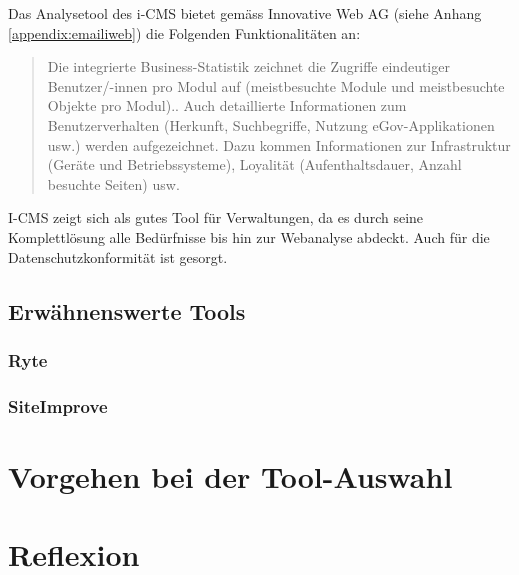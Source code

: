 Das Analysetool des i-CMS bietet gemäss Innovative Web AG (siehe Anhang \ref{appendix:emailiweb}) die Folgenden Funktionalitäten an:

\begin{quote}
  Die integrierte Business-Statistik zeichnet die Zugriffe eindeutiger Benutzer/-innen pro Modul auf (meistbesuchte Module und meistbesuchte Objekte pro Modul).. Auch detaillierte Informationen zum Benutzerverhalten (Herkunft, Suchbegriffe, Nutzung eGov-Applikationen usw.) werden aufgezeichnet. Dazu kommen Informationen zur Infrastruktur (Geräte und Betriebssysteme), Loyalität (Aufenthaltsdauer, Anzahl besuchte Seiten) usw. 
\end{quote}

I-CMS zeigt sich als gutes Tool für Verwaltungen, da es durch seine Komplettlösung alle Bedürfnisse bis hin zur Webanalyse abdeckt. Auch für die Datenschutzkonformität ist gesorgt. 

\subsection{Erwähnenswerte Tools}

\subsubsection{Ryte}

\subsubsection{SiteImprove}

\section{Vorgehen bei der Tool-Auswahl}


\section{Reflexion}